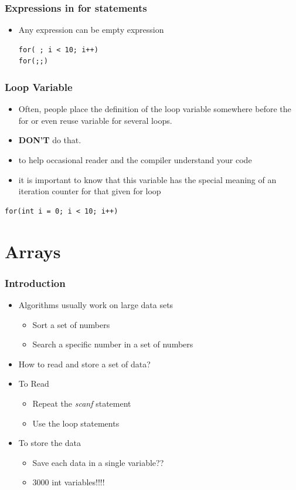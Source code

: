 \documentclass{../c-lecture}
\begin{document}
\begin{frame}[fragile]
  \frametitle{Expressions in for statements}
  \begin{itemize}
    \item Any expression can be empty expression
    \begin{verbatim}
for( ; i < 10; i++)
for(;;)
    \end{verbatim}
  \end{itemize}
\end{frame}

\begin{frame}[fragile]
  \frametitle{Loop Variable}
  \begin{itemize}
    \item
      Often, people place the definition of the loop variable somewhere before the for or even
      reuse variable for several loops.
    \item \textbf{\color{RubineRed} DON'T} do that.
    \item to help occasional reader and the compiler understand your code
    \item it is important to know that this variable has the special meaning of an iteration counter for that given for loop
  \end{itemize}
  \begin{verbatim}
for(int i = 0; i < 10; i++)
  \end{verbatim}
\end{frame}

\section{Arrays}

\begin{frame}
  \frametitle{Introduction}
  \begin{itemize}
    \item Algorithms usually work on large data sets
    \begin{itemize}
      \item Sort a set of numbers
      \item Search a specific number in a set of numbers
    \end{itemize}
    \item How to read and store a set of data?
    \item To Read
    \begin{itemize}
      \item Repeat the \textit{scanf} statement
      \item Use the loop statements
    \end{itemize}
    \item To store the data
    \begin{itemize}
      \item Save each data in a single variable??
      \item 3000 int variables!!!!
    \end{itemize}
  \end{itemize}
\end{frame}
\end{document}
